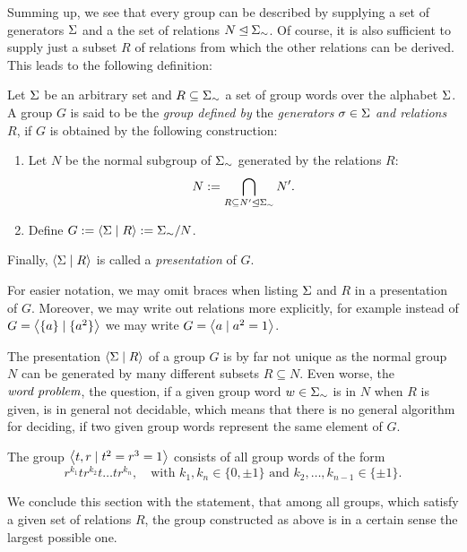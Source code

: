 Summing up, we see that every group can be described by supplying a set of generators $\Sigma$ and a the set of relations $N \unlhd {\Sigma}_{\sim}$. Of course, it is also sufficient to supply just a subset $R$ of relations from which the other relations can be derived. This leads to the following definition:

\begin{definition}
\label{dfn_GrpConstructGenRel}
Let $\Sigma$ be an arbitrary set and $R \subseteq {\Sigma}_{\sim}$ a set of group words over the alphabet $\Sigma$. A group $G$ is said to be the \emph{group defined by} the \emph{generators} $\sigma \in \Sigma$ \emph{and relations} $R$, if $G$ is obtained by the following construction:
\begin{enumerate}
\item Let $N$ be the normal subgroup of ${\Sigma}_{\sim}$ generated by the relations $R$:
\begin{equation*}
N := \bigcap_{R \subseteq N^{\prime} \unlhd {\Sigma}_{\sim}} N^{\prime}.
\end{equation*}
\item Define $G := \left\langle \Sigma \mid R \right\rangle := {\Sigma}_{\sim}/N$.
\end{enumerate}
Finally, $\left\langle \Sigma \mid R \right\rangle$ is called a \emph{presentation} of $G$.
\end{definition}

For easier notation, we may omit braces when listing $\Sigma$ and $R$ in a presentation of $G$. Moreover, we may write out relations more explicitly, for example instead of $G = \left\langle \{a\} \mid \{a^2\} \right\rangle$ we may write $G = \left\langle a \mid a^2 = 1 \right\rangle$.

\begin{remark}
The presentation $\left\langle \Sigma \mid R \right\rangle$ of a group $G$ is by far not unique as the normal group $N$ can be generated by many different subsets $R \subseteq N$. Even worse, the $\emph{word problem}$, \ie the question, if a given group word $w \in {\Sigma}_{\sim}$ is in $N$ when $R$ is given, is in general not decidable, which means that there is no general algorithm for deciding, if two given group words represent the same element of $G$.
\end{remark}

\begin{example}
The group $\left\langle t,r \mid t^2 = r^3 = 1 \right\rangle$ consists of all group words of the form
\begin{equation*}
\label{ex_RTGroup}
r^{k_1} t r^{k_2} t \dots t r^{k_n}, \quad 
\text {with } k_1, k_n \in \{0,\pm 1\} \text{ and } k_2, \dots, k_{n-1} \in \{\pm 1\}.
\end{equation*}
\end{example}
We conclude this section with the statement, that among all groups, which satisfy a given set of relations $R$, the group constructed as above is in a certain sense the largest possible one.

